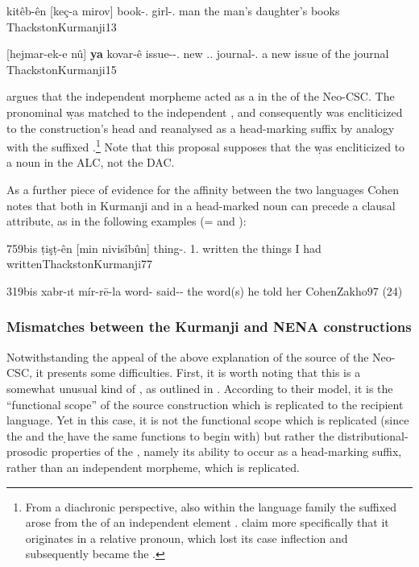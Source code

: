 {kitêb-ên [keç-{a} mirov]}
{book-\ez.\pl{} girl-\ez.\fem{} man}
{the man's daughter's books}
{ThackstonKurmanji}{13}


{[hejmar-ek-e nû] \textbf{ya} kovar-ê} 
{issue-\indef-\ez.\fem{} new \lnk.\ez.\fem{} journal-\obl.\masc}
{a new issue of the journal}
{ThackstonKurmanji}{15}

\citet{CohenEzafe} argues that the independent \ez* morpheme acted as a  in the  of the Neo-CSC. The  pronominal \lnk* \d was matched to the independent \ez*, and consequently was {encliticized} to the construction's head and reanalysed as a head-marking suffix by analogy with the suffixed \ez*.\footnote{From a diachronic perspective, also within the  language family the suffixed \ez* arose from the  of an independent element \citep{HaigLinker}. \citet{HaiderZwanziger} claim more specifically that it originates in a relative pronoun, which lost its case inflection and subsequently became the \ez*.} Note that this proposal supposes that the \d was encliticized to a noun in the ALC, not the DAC. 


As a further piece of evidence for the affinity between the two languages Cohen notes  that both in Kurmanji and in  a head-marked noun can precede a clausal attribute, as in the following examples (= and ):

{759bis}
{ṭişṭ-ên [min nivisîbûn]}
{thing-\ez.\pl{} 1\sg.\obl{} written}
{the things I had written}{ThackstonKurmanji}{77}

{319bis}
{xabr-ıt mír-rē-la}
{word-\cst{} said-\masc-\fem}
{the word(s) he told her}
{CohenZakho}{97 (24)}\antipar

\subsubsection{Mismatches between the Kurmanji and NENA constructions}

Notwithstanding the appeal of the above explanation of the source of the  Neo-CSC, it presents some difficulties. First, it is worth noting that this is a somewhat unusual kind of , as outlined in \citet[836]{MatrasSakel}. According to their model, it is the \enquote{functional scope} of the source construction which is replicated to the recipient language. Yet  in this case, it is not the functional scope which is replicated (since the \ez* and the \d \lnk* have the same functions to begin with) but rather the distributional-prosodic properties of the \ez*, namely its ability to occur as a head-marking suffix, rather than an independent morpheme, which is replicated.  

